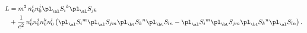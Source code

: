 \begin{equation*}
\begin{split}
  L&=m^2\, n_0^in_0^j\pl_\al S_i{}^k\pl_\al S_{jk}
\\
  &+\frac1{e^2}\,n_0^i n_0^j n_0^k n_0^l\left(
  \pl_\al S_i{}^m\pl_\al S_{jm}\pl_\bt S_k{}^n\pl_\bt S_{ln}
  -\pl_\al S_i{}^m\pl_\bt S_{jm}\pl_\bt S_k{}^n\pl_\al S_{ln}\right).
\end{split}
\end{equation*}

